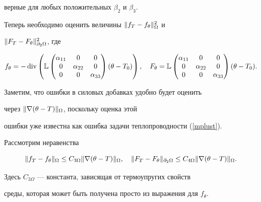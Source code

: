 верные для любых положительных $\beta_2$ и $\beta_3$.





Теперь необходимо оценить величины $\| f_T-f_\theta \|^2_\Omega$ и


$\| F_T-F_\theta \|^2_{\partial_2\Omega}$, где


$$


f_\theta = -\Div \left(\Bbb L


\begin{pmatrix}


\alpha_{11} & 0  & 0 \\


0 & \alpha_{22} & 0 \\


0 & 0  & \alpha_{33}


\end{pmatrix} (\theta-T_0)\right),\quad


F_\theta = \Bbb L


\begin{pmatrix}


\alpha_{11} & 0  & 0 \\


0 & \alpha_{22} & 0 \\


0 & 0  & \alpha_{33}


\end{pmatrix} (\theta-T_0).


$$


Заметим, что ошибки в силовых добавках удобно будет оценить


через $\| \nabla(\theta-T) \|_\Omega$, поскольку оценка этой


ошибки уже известна как ошибка задачи теплопроводности (\ref{mplust}).


Рассмотрим неравенства


$$


\norm{f_T-f_\theta}_\Omega \le


C_{3\Omega} \norm{\nabla(\theta-T)}_\Omega, \quad


\norm{F_T-F_\theta}_{\partial_2\Omega} \le


C_{4\Omega} \norm{\nabla(\theta-T)}_\Omega.


$$


Здесь $C_{3\Omega}$ --- константа, зависящая от термоупругих свойств


среды, которая может быть получена просто из выражения для $f_\theta$.


